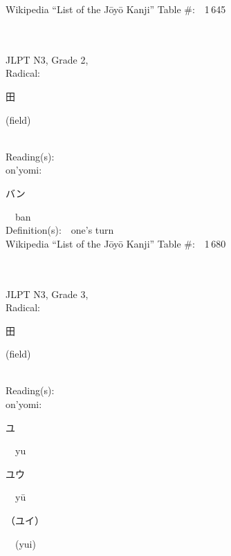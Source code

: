 \begin{multicols}{2}
Wikipedia ``List of the J\=oy\=o Kanji'' Table \#:\ \ 1\,645 \\
\ \ \\
{\fontsize{34pt}{40pt}  }\ \ \\  %
{JLPT N3, Grade 2, \\Radical:\ \ {\begin{CJK}{UTF8}{min} 田 \end{CJK}} (field) } \\
Reading(s):\ \ \\
{\hspace*{1em}}on'yomi:\ \ \\
{\hspace*{2em}}{\begin{CJK}{UTF8}{min} バン \end{CJK}}\ \ ban\ \ \\
Definition(s):\ \ one's turn \\
Wikipedia ``List of the J\=oy\=o Kanji'' Table \#:\ \ 1\,680 \\
\ \ \\
{\fontsize{34pt}{40pt}  }\ \ \\  %
{JLPT N3, Grade 3, \\Radical:\ \ {\begin{CJK}{UTF8}{min} 田 \end{CJK}} (field) } \\
Reading(s):\ \ \\
{\hspace*{1em}}on'yomi:\ \ \\
{\hspace*{2em}}{\begin{CJK}{UTF8}{min} ユ \end{CJK}}\ \ yu\ \ \\
{\hspace*{2em}}{\begin{CJK}{UTF8}{min} ユウ \end{CJK}}\ \ y\=u\ \ \\
{\hspace*{2em}}{\begin{CJK}{UTF8}{min} （ユイ） \end{CJK}}\ \ (yui)\ \ \\

\end{multicols}
